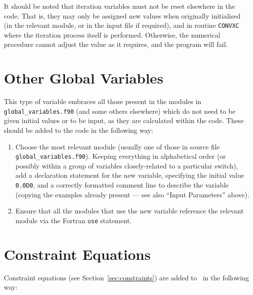 It should be noted that iteration variables must not be reset elsewhere in the
code. That is, they may only be assigned new values when originally
initialised (in the relevant module, or in the input file if required), and in
routine \texttt{CONVXC} where the iteration process itself is performed.
Otherwise, the numerical procedure cannot adjust the value as it requires, and
the program will fail.

\section{Other Global Variables}

This type of variable embraces all those present in the modules in
\texttt{global\_variables.f90} (and some others elsewhere) which do not need
to be given initial values or to be input, as they are calculated within the
code. These should be added to the code in the following way:

\begin{enumerate}

\item Choose the most relevant module (usually one of those in source file
  \texttt{global\_variables.f90}). Keeping everything in alphabetical order
  (or possibly within a group of variables closely-related to a particular
  switch), add a declaration statement for the new variable, specifying the
  initial value \texttt{0.0D0}, and a correctly formatted comment line to
  describe the variable (copying the examples already present --- see also
  ``Input Parameters'' above).

\item Ensure that all the modules that use the new variable reference the
  relevant module via the Fortran \texttt{use} statement.

\end{enumerate}

\section{Constraint Equations}

Constraint equations (see Section~\ref{sec:constraints}) are added to
\process\ in the following way:

